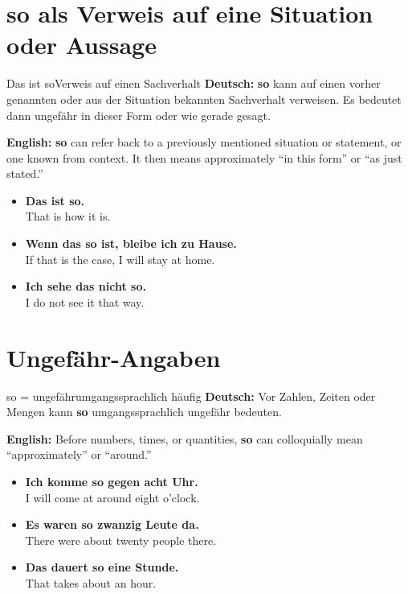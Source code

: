 \documentclass[a4paper,11pt]{article}
\newcommand{\GermanText}[1]{\textbf{Deutsch: }#1\par}
\newcommand{\EnglishText}[1]{{\small\color{SoftGray}\textbf{English: }#1\par}}
\newcommand{\ExampleItem}[2]{\item \textbf{#1}\\{\small\color{SoftGray}#2}}
\begin{document}
    \section{\glqq so\grqq{} als Verweis auf eine Situation oder Aussage}

        \begin{grammarentry}{Das ist so}{Verweis auf einen Sachverhalt}
            \GermanText{\textbf{so} kann auf einen vorher genannten oder aus der Situation bekannten Sachverhalt verweisen. Es bedeutet dann ungefähr \glqq in dieser Form\grqq{} oder \glqq wie gerade gesagt\grqq.}
            \EnglishText{\textbf{so} can refer back to a previously mentioned situation or statement, or one known from context. It then means approximately ``in this form'' or ``as just stated.''}
        \end{grammarentry}

        \begin{exbox}
            \begin{itemize}
                \ExampleItem{Das ist so.}{That is how it is.}
                \ExampleItem{Wenn das so ist, bleibe ich zu Hause.}{If that is the case, I will stay at home.}
                \ExampleItem{Ich sehe das nicht so.}{I do not see it that way.}
            \end{itemize}
        \end{exbox}

    \section{Ungefähr-Angaben}

        \begin{grammarentry}{so = ungefähr}{umgangssprachlich häufig}
            \GermanText{Vor Zahlen, Zeiten oder Mengen kann \textbf{so} umgangssprachlich \glqq ungefähr\grqq{} bedeuten.}
            \EnglishText{Before numbers, times, or quantities, \textbf{so} can colloquially mean ``approximately'' or ``around.''}
        \end{grammarentry}

        \begin{exbox}
            \begin{itemize}
                \ExampleItem{Ich komme so gegen acht Uhr.}{I will come at around eight o'clock.}
                \ExampleItem{Es waren so zwanzig Leute da.}{There were about twenty people there.}
                \ExampleItem{Das dauert so eine Stunde.}{That takes about an hour.}
            \end{itemize}
        \end{exbox}
\end{document}
